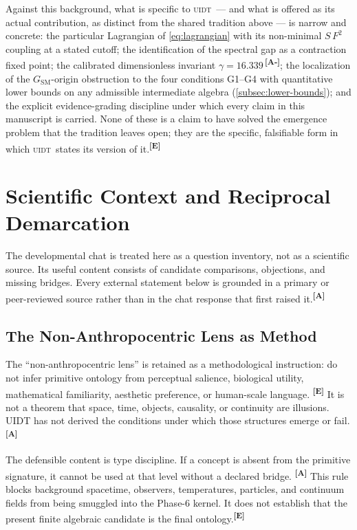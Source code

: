 \documentclass[12pt,a4paper,twoside]{article}
\theoremstyle{plain}
\theoremstyle{definition}
\theoremstyle{remark}
\newcommand{\UIDT}{\textsc{uidt}}
\newcommand{\catmark}[1]{\textsuperscript{\textsf{\textbf{[#1]}}}}
\newcommand{\GammaGeom}{16.339} %
\begin{document}
\noindent Against this background, what is specific to \UIDT\ --- and
what is offered as its actual contribution, as distinct from the shared
tradition above --- is narrow and concrete: the particular Lagrangian of
\cref{eq:lagrangian} with its non-minimal $S\,F^2$ coupling at a stated
cutoff; the identification of the spectral gap as a contraction fixed
point; the calibrated dimensionless invariant $\gamma =
\GammaGeom$\,\catmark{A-}; the localization of the
$G_{\mathrm{SM}}$-origin obstruction to the four conditions G1--G4 with
quantitative lower bounds on any admissible intermediate algebra
(\cref{subsec:lower-bounds}); and the explicit evidence-grading
discipline under which every claim in this manuscript is carried. None of
these is a claim to have solved the emergence problem that the tradition
leaves open; they are the specific, falsifiable form in which \UIDT\
states its version of it.\catmark{E}

\section{Scientific Context and Reciprocal Demarcation}
\label{sec:ctx-scientific-context}

The developmental chat is treated here as a question inventory, not as a
scientific source. Its useful content consists of candidate comparisons,
objections, and missing bridges. Every external statement below is grounded in
a primary or peer-reviewed source rather than in the chat response that first
raised it.\catmark{A}

\subsection{The Non-Anthropocentric Lens as Method}
\label{subsec:ctx-nonanthropocentric-method}

The ``non-anthropocentric lens'' is retained as a methodological instruction:
do not infer primitive ontology from perceptual salience, biological utility,
mathematical familiarity, aesthetic preference, or human-scale language.
\catmark{E} It is not a theorem that space, time, objects, causality, or
continuity are illusions. UIDT has not derived the conditions under which those
structures emerge or fail.\catmark{A}

The defensible content is type discipline. If a concept is absent from the
primitive signature, it cannot be used at that level without a declared bridge.
\catmark{A} This rule blocks background spacetime, observers, temperatures,
particles, and continuum fields from being smuggled into the Phase-6 kernel. It
does not establish that the present finite algebraic candidate is the final
ontology.\catmark{E}
\end{document}
